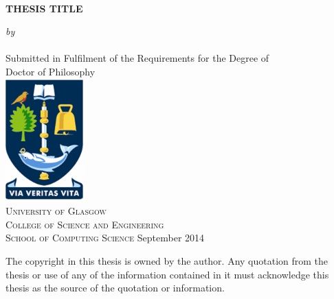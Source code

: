 \documentclass[a4paper,12pt]{report}
\newcommand{\auth}{FName LName}
\newcommand{\thesistitle}{Thesis Title}
\newcommand{\degree}{Doctor of Philosophy}
\newcommand{\supdate}{September 2014}
\begin{document}
\begin{spacing}{1.5}

\pagestyle{empty}
\begin{center}
\begin{spacing}{2}
{\large{\ \\  \vspace{1.5cm}\textbf{\MakeUppercase{\thesistitle}}}}\\
\end{spacing}
\vfill
{\Large\textit{by}}\\\vspace{0.2cm}
{\Large\upshape{\auth}}\\\vspace{1.0cm}
{\large Submitted in Fulfilment of the Requirements for the Degree of \\ \degree}\\
\vspace{1cm}
\includegraphics[width=3cm]{Front/Figures/Logo.png}\\
\vspace{0.5cm}
{\large\textsc{University of Glasgow}\\
\textsc{College of Science and Engineering}\\
\textsc{School of Computing Science}}\vfill
{\large{\supdate}}
\end{center}
{\small The copyright in this thesis is owned by the author. Any quotation from the thesis or use of any of the information contained in it must acknowledge this thesis as the source of the quotation or information.}
\clearpage
\pagestyle{plain}

\newpage
\tableofcontents
\listoftables
\listoffigures
\newpage

\newpage

\newpage



\clearpage
\pagestyle{fancy}
\fancyhead{}
\lhead{\slshape \leftmark}  
\cfoot{\thepage}
\renewcommand{\headrulewidth}{0.4pt}
\renewcommand{\footrulewidth}{0.0pt}
\renewcommand{\chaptermark}[1]{\markboth{\chaptername\ \thechapter. \ #1}{}}



\end{spacing}
\end{document}
